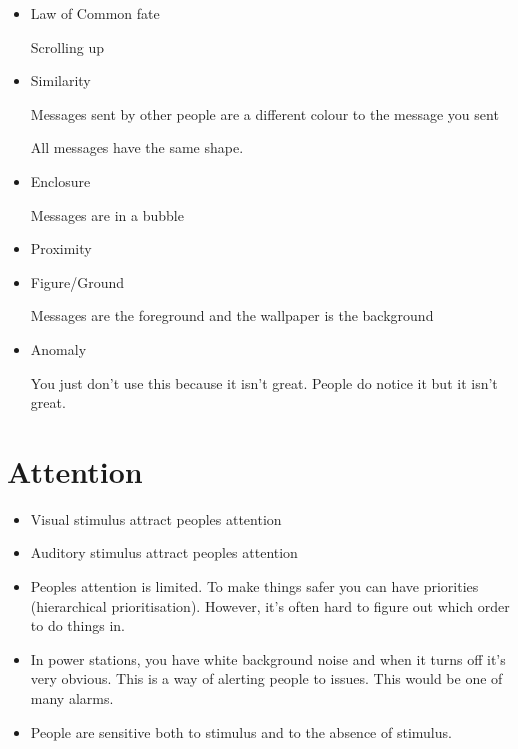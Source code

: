 \documentclass[10pt, a4paper]{article}
\begin{document}
\begin{itemize}

\item Law of Common fate

Scrolling up

\item Similarity

Messages sent by other people are a different colour to the message you sent

All messages have the same shape.

\item Enclosure

Messages are in a bubble

\item Proximity

\item Figure/Ground

Messages are the foreground and the wallpaper is the background

\item Anomaly

You just don't use this because it isn't great. People do notice it but it isn't great.

\end{itemize}

\section{Attention}

\begin{itemize}

\item Visual stimulus attract peoples attention

\item Auditory stimulus attract peoples attention

\item Peoples attention is limited. To make things safer you can have priorities (hierarchical prioritisation).
However, it's often hard to figure out which order to do things in.

\item In power stations, you have white background noise and when it turns off it's very obvious. This is a way of
alerting people to issues. This would be one of many alarms.

\item People are sensitive both to stimulus and to the absence of stimulus.

\end{itemize}
\end{document}

